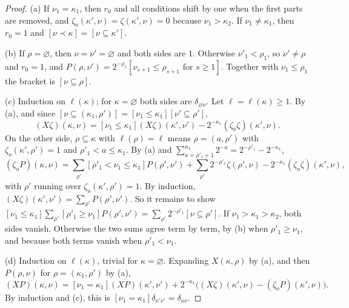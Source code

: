 \documentclass[11pt]{amsart}
\theoremstyle{definition}
\theoremstyle{remark}
\begin{document}
\begin{proof}
(a) If $\nu_1=\kappa_1$, then $r_0$ and all conditions shift by one when the first parts are
removed, and $\zeta_o(\kappa',\nu)=\zeta(\kappa',\nu)=0$ because $\nu_1>\kappa_2$. If
$\nu_1\ne\kappa_1$, then $r_0=1$ and $[\nu\prec\kappa]=[\nu\subseteq\kappa']$.

(b) If $\rho=\varnothing$, then $\nu=\nu'=\varnothing$ and both sides are $1$. Otherwise
$\nu'_1<\rho_1$, so $\nu'\ne\rho$ and $r_0=1$, and
$P(\rho,\nu')=2^{-\rho_1}[\nu_{s+1}\le\rho_{s+1}\text{ for }s\ge1]$. Together with
$\nu_1\le\rho_1$ the bracket is $[\nu\subseteq\rho]$.

(c) Induction on $\ell(\kappa)$; for $\kappa=\varnothing$ both sides are
$\delta_{\varnothing\nu}$. Let $\ell=\ell(\kappa)\ge1$. By (a), and since
$[\nu\subseteq(\kappa_1,\rho')]=[\nu_1\le\kappa_1][\nu'\subseteq\rho']$,
\[ (X\zeta)(\kappa,\nu)=[\nu_1\le\kappa_1](X\zeta)(\kappa',\nu')-2^{-\kappa_1}(\zeta_o\zeta)(\kappa',\nu). \]
On the other side, $\rho\subseteq\kappa$ with $\ell(\rho)=\ell$ means $\rho=(a,\rho')$ with
$\zeta_o(\kappa',\rho')=1$ and $\rho'_1<a\le\kappa_1$. By (a) and
$\sum_{a=\rho'_1+1}^{\kappa_1}2^{-a}=2^{-\rho'_1}-2^{-\kappa_1}$,
\[ (\zeta_oP)(\kappa,\nu)=\sum_{\rho'}[\rho'_1<\nu_1\le\kappa_1]P(\rho',\nu')
+\sum_{\rho'}2^{-\rho'_1}\zeta(\rho',\nu)-2^{-\kappa_1}(\zeta_o\zeta)(\kappa',\nu), \]
with $\rho'$ running over $\zeta_o(\kappa',\rho')=1$. By induction,
$(X\zeta)(\kappa',\nu')=\sum_{\rho'}P(\rho',\nu')$. So it remains to show
$[\nu_1\le\kappa_1]\sum_{\rho'}[\rho'_1\ge\nu_1]P(\rho',\nu')=\sum_{\rho'}2^{-\rho'_1}[\nu\subseteq\rho']$.
If $\nu_1>\kappa_1>\kappa_2$, both sides vanish. Otherwise the two sums agree term by term, by (b)
when $\rho'_1\ge\nu_1$, and because both terms vanish when $\rho'_1<\nu_1$.

(d) Induction on $\ell(\kappa)$, trivial for $\kappa=\varnothing$. Expanding $X(\kappa,\rho)$ by
(a), and then $P(\rho,\nu)$ for $\rho=(\kappa_1,\rho')$ by (a),
\[ (XP)(\kappa,\nu)=[\nu_1=\kappa_1](XP)(\kappa',\nu')+2^{-\kappa_1}\bigl((X\zeta)(\kappa',\nu)-(\zeta_oP)(\kappa',\nu)\bigr). \]
By induction and (c), this is $[\nu_1=\kappa_1]\delta_{\kappa'\nu'}=\delta_{\kappa\nu}$.
\end{proof}
\end{document}
